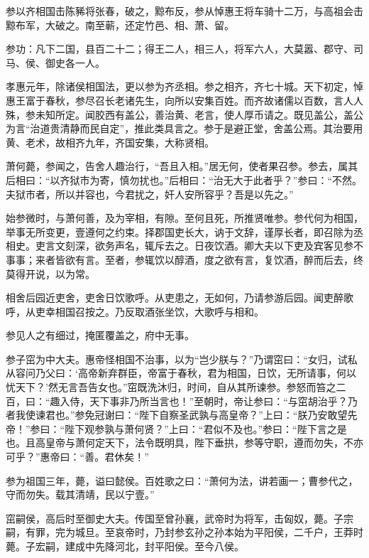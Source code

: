 \documentclass[12pt,UTF8]{ctexbook}
\begin{document}
参以齐相国击陈豨将张春，破之，黥布反，参从悼惠王将车骑十二万，与高祖会击黥布军，大破之。南至蕲，还定竹邑、相、萧、留。



参功：凡下二国，县百二十二；得王二人，相三人，将军六人，大莫嚣、郡守、司马、侯、御史各一人。



孝惠元年，除诸侯相国法，更以参为齐丞相。参之相齐，齐七十城。天下初定，悼惠王富于春秋，参尽召长老诸先生，向所以安集百姓。而齐故诸儒以百数，言人人殊，参未知所定。闻胶西有盖公，善治黄、老言，使人厚币请之。既见盖公，盖公为言“治道贵清静而民自定”，推此类具言之。参于是避正堂，舍盖公焉。其治要用黄、老术，故相齐九年，齐国安集，大称贤相。



萧何薨，参闻之，告舍人趣治行，“吾且入相。”居无何，使者果召参。参去，属其后相曰：“以齐狱市为寄，慎勿扰也。”后相曰：“治无大于此者乎？”参曰：“不然。夫狱市者，所以并容也，今君扰之，奸人安所容乎？吾是以先之。”



始参微时，与萧何善，及为宰相，有隙。至何且死，所推贤唯参。参代何为相国，举事无所变更，壹遵何之约束。择郡国吏长大，讷于文辞，谨厚长者，即召除为丞相史。吏言文刻深，欲务声名，辄斥去之。日夜饮酒。卿大夫以下吏及宾客见参不事事；来者皆欲有言。至者，参辄饮以醇酒，度之欲有言，复饮酒，醉而后去，终莫得开说，以为常。



相舍后园近吏舍，吏舍日饮歌呼。从吏患之，无如何，乃请参游后园。闻吏醉歌呼，从吏幸相国召按之。乃反取酒张坐饮，大歌呼与相和。



参见人之有细过，掩匿覆盖之，府中无事。



参子窋为中大夫。惠帝怪相国不治事，以为“岂少朕与？”乃谓窋曰：“女归，试私从容问乃父曰：‘高帝新弃群臣，帝富于春秋，君为相国，日饮，无所请事，何以忧天下？’然无言吾告女也。”窋既洗沐归，时间，自从其所谏参。参怒而笞之二百，曰：“趣入侍，天下事非乃所当言也！”至朝时，帝让参曰：“与窋胡治乎？乃者我使谏君也。”参免冠谢曰：“陛下自察圣武孰与高皇帝？”上曰：“朕乃安敢望先帝！”参曰：“陛下观参孰与萧何贤？”上曰：“君似不及也。”参曰：“陛下言之是也。且高皇帝与萧何定天下，法令既明具，陛下垂拱，参等守职，遵而勿失，不亦可乎？”惠帝曰：“善。君休矣！”



参为祖国三年，薨，谥曰懿侯。百姓歌之曰：“萧何为法，讲若画一；曹参代之，守而勿失。载其清靖，民以宁壹。”



窋嗣侯，高后时至御史大夫。传国至曾孙襄，武帝时为将军，击匈奴，薨。子宗嗣，有罪，完为城旦。至哀帝时，乃封参玄孙之孙本始为平阳侯，二千户，王莽时薨。子宏嗣，建成中先降河北，封平阳侯。至今八侯。
\end{document}
